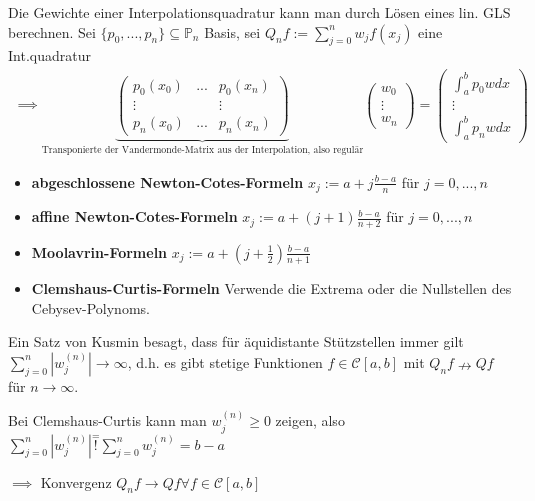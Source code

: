 \begin{remark}
	Die Gewichte einer Interpolationsquadratur kann man durch Lösen eines lin. GLS berechnen. Sei $\{p_0, ..., p_n\} \subseteq \mathbb{P}_n$ Basis, sei $Q_nf := \sum_{j=0}^{n} w_j f(x_j)$ eine Int.quadratur
	\begin{align*}
		\implies \underbrace{\left(\begin{matrix}
				p_0(x_0) & ... & p_0(x_n)\\
				\vdots & & \vdots\\
				p_n(x_0) & ... & p_n(x_n)
			\end{matrix}\right)}_{\text{Transponierte der Vandermonde-Matrix aus der Interpolation, also regulär}}
		\left(\begin{matrix}
			w_0\\ \vdots\\ w_n
		\end{matrix}\right) =
		\left(\begin{matrix}
			\int_{a}^{b} p_0 w dx\\ \vdots \\ \int_{a}^{b} p_n w dx
		\end{matrix}\right)
	\end{align*}
\end{remark}

\begin{example}
	\begin{itemize}
		\item \textbf{abgeschlossene Newton-Cotes-Formeln} $x_j := a + j \frac{b-a}{n}$ für $j=0, ..., n$
		\item \textbf{affine Newton-Cotes-Formeln} $x_j := a + (j+1) \frac{b-a}{n+2}$ für $j=0, ..., n$
		\item \textbf{Moolavrin-Formeln} $x_j := a + (j+\frac{1}{2}) \frac{b-a}{n+1}$
		\item \textbf{Clemshaus-Curtis-Formeln} Verwende die Extrema oder die Nullstellen des Cebysev-Polynoms.
	\end{itemize}
\end{example}

\begin{remark}
	Ein Satz von Kusmin besagt, dass für äquidistante Stützstellen immer gilt $\sum_{j=0}^{n} |w_j^{(n)}| \rightarrow\infty$, d.h. es gibt stetige Funktionen $f \in \mathcal{C}[a,b]$ mit $Q_nf \nrightarrow Qf$ für $n \rightarrow\infty$.
	
	Bei Clemshaus-Curtis kann man $w_j^{(n)} \geq 0$ zeigen, also $\sum_{j=0}^{n} |w_j^{(n)}| \overset{=}{!} \sum_{j=0}^{n} w_j^{(n)} = b-a$
	
	$\implies$ Konvergenz $Q_nf \rightarrow Qf \forall f \in \mathcal{C}[a,b]$
\end{remark}

